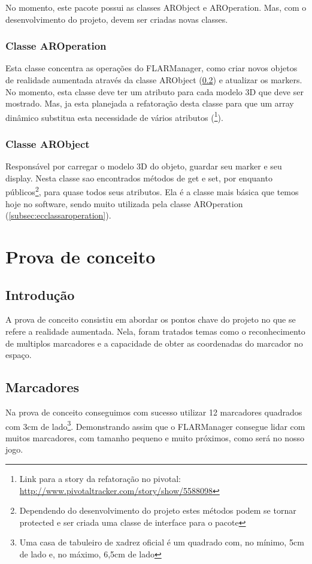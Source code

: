 \documentclass[a4paper,12pt]{book}
\begin{document}
		No momento, este pacote possui as classes ARObject e AROperation. Mas, com o
		desenvolvimento do projeto, devem ser criadas novas classes.
		
		\subsection{Classe AROperation}
		\label{subsec:ecclassearoperation}
		Esta classe concentra as opera\c c\~oes do FLARManager, como criar novos
		objetos de realidade aumentada atrav\'es da classe ARObject
		(\ref{subsec:ecclassearobject}) e atualizar os markers.
		No momento, esta classe deve ter um atributo para cada modelo 3D que deve ser
		mostrado. Mas, ja esta planejada a refatora\c c\~ao desta classe para que um
		array din\^amico substitua esta necessidade de v\'arios atributos
		(\footnote{Link para a story da refatora\c c\~ao no	pivotal: \url{http://www.pivotaltracker.com/story/show/5588098}}).
		
		
		\subsection{Classe ARObject}
		\label{subsec:ecclassearobject}
		Respons\'avel por carregar o modelo 3D do objeto, guardar seu marker e seu
		display. Nesta classe sao encontrados m\'etodos de get e set, por enquanto
		p\'ublicos\footnote{Dependendo do desenvolvimento do projeto estes m\'etodos
		podem se tornar protected e ser criada uma classe de interface para o pacote},
		para quase todos seus atributos. Ela \'e a classe mais b\'asica que temos hoje no software, sendo muito utilizada pela classe AROperation (\ref{subsec:ecclassaroperation}).
		
	\chapter{Prova de conceito}
	\label{ch:provadeconceito}
		\section{Introdu\c c\~ao}
		\label{sec:pcintroducao}
		A prova de conceito consistiu em abordar os pontos chave do projeto no que se
		refere a realidade aumentada. Nela, foram tratados temas como o reconhecimento
		de multiplos marcadores e a capacidade de obter as coordenadas do marcador no
		espa\c co.
		
		\section{Marcadores}
		\label{sec:pcmarcadores}
		Na prova de conceito conseguimos com sucesso utilizar 12 marcadores quadrados
		com 3cm de lado\footnote{Uma casa de tabuleiro de xadrez oficial \'e um
		quadrado com, no m\'inimo, 5cm de lado e, no m\'aximo, 6,5cm de lado}. Demonstrando assim que
		o FLARManager consegue lidar com muitos marcadores, com tamanho pequeno e muito pr\'oximos, como ser\'a no
		nosso jogo.
		
\end{document}
